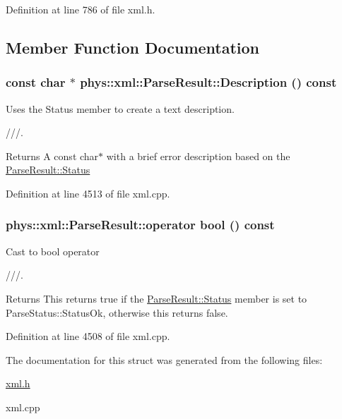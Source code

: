 Definition at line 786 of file xml.h.



\subsection{Member Function Documentation}
\hypertarget{structphys_1_1xml_1_1ParseResult_aeda9dd881b93496c5500cb810b2e937d}{
\subsubsection[{Description}]{\setlength{\rightskip}{0pt plus 5cm}const char $\ast$ phys::xml::ParseResult::Description () const}}
\label{d5/dea/structphys_1_1xml_1_1ParseResult_aeda9dd881b93496c5500cb810b2e937d}


Uses the Status member to create a text description. \par
 ///. 

\begin{DoxyReturn}{Returns}
A const char$\ast$ with a brief error description based on the \hyperlink{structphys_1_1xml_1_1ParseResult_a1bf9dfeebdb07656723bbaf18ab612b5}{ParseResult::Status} 
\end{DoxyReturn}


Definition at line 4513 of file xml.cpp.

\hypertarget{structphys_1_1xml_1_1ParseResult_a95c9989865c1bace7846995166a13e31}{
\subsubsection[{operator bool}]{\setlength{\rightskip}{0pt plus 5cm}phys::xml::ParseResult::operator bool () const}}
\label{d5/dea/structphys_1_1xml_1_1ParseResult_a95c9989865c1bace7846995166a13e31}


Cast to bool operator \par
 ///. 

\begin{DoxyReturn}{Returns}
This returns true if the \hyperlink{structphys_1_1xml_1_1ParseResult_a1bf9dfeebdb07656723bbaf18ab612b5}{ParseResult::Status} member is set to ParseStatus::StatusOk, otherwise this returns false. 
\end{DoxyReturn}


Definition at line 4508 of file xml.cpp.



The documentation for this struct was generated from the following files:\begin{DoxyCompactItemize}
\item 
\hyperlink{xml_8h}{xml.h}\item 
xml.cpp\end{DoxyCompactItemize}

